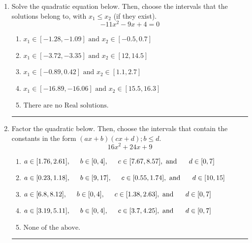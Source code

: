 \documentclass[14pt]{extbook}
\newcommand{\litem}[1]{\item#1\hspace*{-1cm}\rule{\textwidth}{0.4pt}}
\begin{document}
\begin{enumerate}
\litem{
Solve the quadratic equation below. Then, choose the intervals that the solutions belong to, with $x_1 \leq x_2$ (if they exist).\[ -11x^{2} -9 x + 4 = 0 \]\begin{enumerate}[label=\Alph*.]
\item \( x_1 \in [-1.28, -1.09] \text{ and } x_2 \in [-0.5, 0.7] \)
\item \( x_1 \in [-3.72, -3.35] \text{ and } x_2 \in [12, 14.5] \)
\item \( x_1 \in [-0.89, 0.42] \text{ and } x_2 \in [1.1, 2.7] \)
\item \( x_1 \in [-16.89, -16.06] \text{ and } x_2 \in [15.5, 16.3] \)
\item \( \text{There are no Real solutions.} \)

\end{enumerate} }
\litem{
Factor the quadratic below. Then, choose the intervals that contain the constants in the form $(ax+b)(cx+d); b \leq d.$\[ 16x^{2} +24 x + 9 \]\begin{enumerate}[label=\Alph*.]
\item \( a \in [1.76, 2.61], \hspace*{5mm} b \in [0, 4], \hspace*{5mm} c \in [7.67, 8.57], \text{ and } \hspace*{5mm} d \in [0, 7] \)
\item \( a \in [0.23, 1.18], \hspace*{5mm} b \in [9, 17], \hspace*{5mm} c \in [0.55, 1.74], \text{ and } \hspace*{5mm} d \in [10, 15] \)
\item \( a \in [6.8, 8.12], \hspace*{5mm} b \in [0, 4], \hspace*{5mm} c \in [1.38, 2.63], \text{ and } \hspace*{5mm} d \in [0, 7] \)
\item \( a \in [3.19, 5.11], \hspace*{5mm} b \in [0, 4], \hspace*{5mm} c \in [3.7, 4.25], \text{ and } \hspace*{5mm} d \in [0, 7] \)
\item \( \text{None of the above.} \)


\end{enumerate}}
\end{enumerate}
\end{document}

